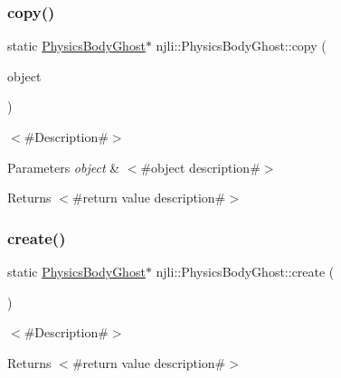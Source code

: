 \subsubsection{\texorpdfstring{copy()}{copy()}}
{\footnotesize\ttfamily static \mbox{\hyperlink{classnjli_1_1_physics_body_ghost}{Physics\+Body\+Ghost}}$\ast$ njli\+::\+Physics\+Body\+Ghost\+::copy (\begin{DoxyParamCaption}\item[{const \mbox{\hyperlink{classnjli_1_1_physics_body_ghost}{Physics\+Body\+Ghost}} \&}]{object }\end{DoxyParamCaption})\hspace{0.3cm}{\ttfamily [static]}}

$<$\#\+Description\#$>$


\begin{DoxyParams}{Parameters}
{\em object} & $<$\#object description\#$>$\\
\hline
\end{DoxyParams}
\begin{DoxyReturn}{Returns}
$<$\#return value description\#$>$ 
\end{DoxyReturn}
\mbox{\label{classnjli_1_1_physics_body_ghost_a7434dc568f080596a8f87a35e60343cf}} 
\subsubsection{\texorpdfstring{create()}{create()}\hspace{0.1cm}{\footnotesize\ttfamily [1/2]}}
{\footnotesize\ttfamily static \mbox{\hyperlink{classnjli_1_1_physics_body_ghost}{Physics\+Body\+Ghost}}$\ast$ njli\+::\+Physics\+Body\+Ghost\+::create (\begin{DoxyParamCaption}{ }\end{DoxyParamCaption})\hspace{0.3cm}{\ttfamily [static]}}

$<$\#\+Description\#$>$

\begin{DoxyReturn}{Returns}
$<$\#return value description\#$>$ 
\end{DoxyReturn}
\mbox{\label{classnjli_1_1_physics_body_ghost_aff9751cceeb013ff72d5c7a187f7337c}} 
